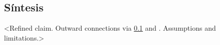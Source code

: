 
\subsection{Síntesis}

<Refined claim. Outward connections via \ref{} and \cite{}. Assumptions and limitations.>


%
